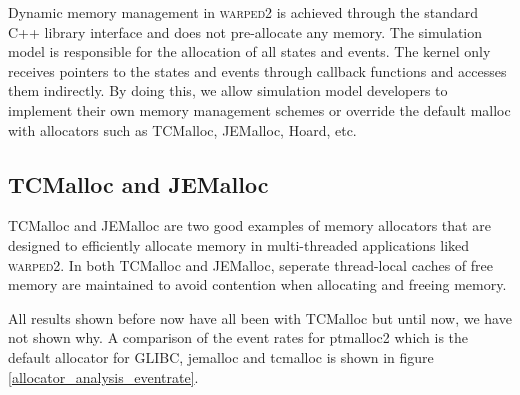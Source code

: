 \documentclass[11pt]{book}
\begin{document}
Dynamic memory management in \textsc{warped2} is achieved through the standard C++ library
interface and does not pre-allocate any memory. The simulation model is responsible for the
allocation of all states and events. The kernel only receives pointers to the states and events
through callback functions and accesses them indirectly. By doing this, we allow simulation model
developers to implement their own memory management schemes or override the default malloc with
allocators such as TCMalloc, JEMalloc, Hoard, etc.

\subsection{TCMalloc and JEMalloc}

TCMalloc and JEMalloc are two good examples of memory allocators that are designed to efficiently
allocate memory in multi-threaded applications liked \textsc{warped2}. In both TCMalloc and
JEMalloc, seperate thread-local caches of free memory are maintained to avoid contention when
allocating and freeing memory.

All results shown before now have all been with TCMalloc but until now, we have not shown why.
A comparison of the event rates for ptmalloc2 which is the default allocator for GLIBC, jemalloc
and tcmalloc is shown in figure \ref{allocator_analysis_eventrate}.
\end{document}
